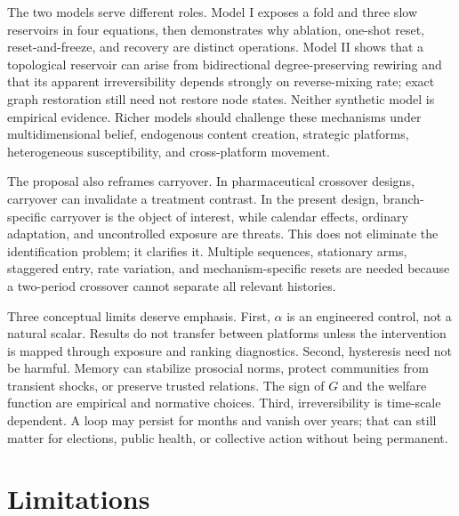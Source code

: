 \documentclass[pdflatex,sn-mathphys-num]{sn-jnl}
\begin{document}
The two models serve different roles. Model I exposes a fold and three slow reservoirs in four equations, then demonstrates why ablation, one-shot reset, reset-and-freeze, and recovery are distinct operations. Model II shows that a topological reservoir can arise from bidirectional degree-preserving rewiring and that its apparent irreversibility depends strongly on reverse-mixing rate; exact graph restoration still need not restore node states. Neither synthetic model is empirical evidence. Richer models should challenge these mechanisms under multidimensional belief, endogenous content creation, strategic platforms, heterogeneous susceptibility, and cross-platform movement.

The proposal also reframes carryover. In pharmaceutical crossover designs, carryover can invalidate a treatment contrast. In the present design, branch-specific carryover is the object of interest, while calendar effects, ordinary adaptation, and uncontrolled exposure are threats. This does not eliminate the identification problem; it clarifies it. Multiple sequences, stationary arms, staggered entry, rate variation, and mechanism-specific resets are needed because a two-period crossover cannot separate all relevant histories.

Three conceptual limits deserve emphasis. First, $\alpha$ is an engineered control, not a natural scalar. Results do not transfer between platforms unless the intervention is mapped through exposure and ranking diagnostics. Second, hysteresis need not be harmful. Memory can stabilize prosocial norms, protect communities from transient shocks, or preserve trusted relations. The sign of $G$ and the welfare function are empirical and normative choices. Third, irreversibility is time-scale dependent. A loop may persist for months and vanish over years; that can still matter for elections, public health, or collective action without being permanent.

\section{Limitations}
\end{document}
